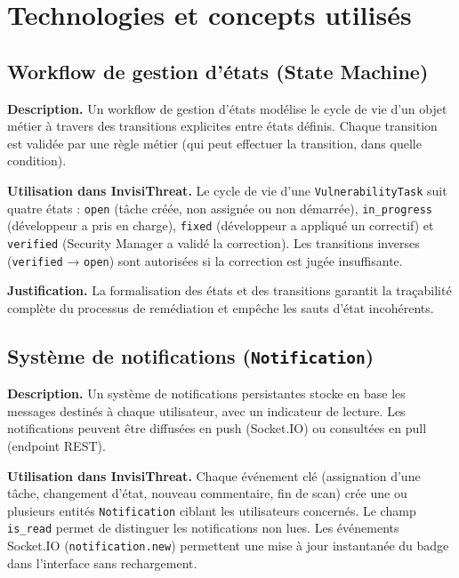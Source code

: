 \section{Technologies et concepts utilisés}

\subsection{Workflow de gestion d'états (State Machine)}

\textbf{Description.} Un workflow de gestion d'états modélise le cycle de vie d'un objet métier à travers des transitions explicites entre états définis. Chaque transition est validée par une règle métier (qui peut effectuer la transition, dans quelle condition).

\textbf{Utilisation dans InvisiThreat.} Le cycle de vie d'une \texttt{VulnerabilityTask} suit quatre états : \texttt{open} (tâche créée, non assignée ou non démarrée), \texttt{in\_progress} (développeur a pris en charge), \texttt{fixed} (développeur a appliqué un correctif) et \texttt{verified} (Security Manager a validé la correction). Les transitions inverses (\texttt{verified} → \texttt{open}) sont autorisées si la correction est jugée insuffisante.

\textbf{Justification.} La formalisation des états et des transitions garantit la traçabilité complète du processus de remédiation et empêche les sauts d'état incohérents.

\subsection{Système de notifications (\texttt{Notification})}

\textbf{Description.} Un système de notifications persistantes stocke en base les messages destinés à chaque utilisateur, avec un indicateur de lecture. Les notifications peuvent être diffusées en push (Socket.IO) ou consultées en pull (endpoint REST).

\textbf{Utilisation dans InvisiThreat.} Chaque événement clé (assignation d'une tâche, changement d'état, nouveau commentaire, fin de scan) crée une ou plusieurs entités \texttt{Notification} ciblant les utilisateurs concernés. Le champ \texttt{is\_read} permet de distinguer les notifications non lues. Les événements Socket.IO (\texttt{notification.new}) permettent une mise à jour instantanée du badge dans l'interface sans rechargement.

